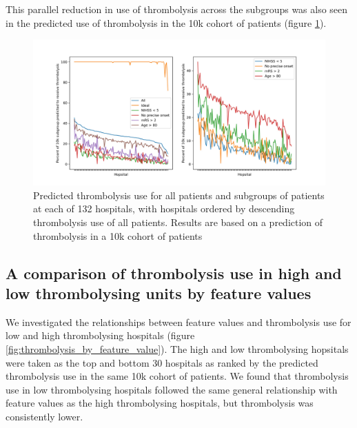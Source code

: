 This parallel reduction in use of thrombolysis across the subgroups was also seen in the predicted use of thrombolysis in the 10k cohort of patients (figure \ref{fig:subgroup_rate_2}).

\begin{figure}
\centering
\includegraphics[width=1\textwidth]{./images/15_10k_subgroup}
\caption{Predicted thrombolysis use for all patients and subgroups of patients at each of 132 hospitals, with hospitals ordered by descending thrombolysis use of all patients. Results are based on a prediction of thrombolysis in a 10k cohort of patients}
\label{fig:subgroup_rate_2}
\end{figure}


\subsection{A comparison of thrombolysis use in high and low thrombolysing units by feature values}

We investigated the relationships between feature values and thrombolysis use for low and high thrombolysing hospitals (figure \ref{fig:thrombolysis_by_feature_value}). The high and low thrombolysing hopsitals were taken as the top and bottom 30 hospitals as ranked by the predicted thrombolysis use in the same 10k cohort of patients. We found that thrombolysis use in low thrombolysing hospitals followed the same general relationship with feature values as the high thrombolysing hospitals, but thrombolysis was consistently lower.

